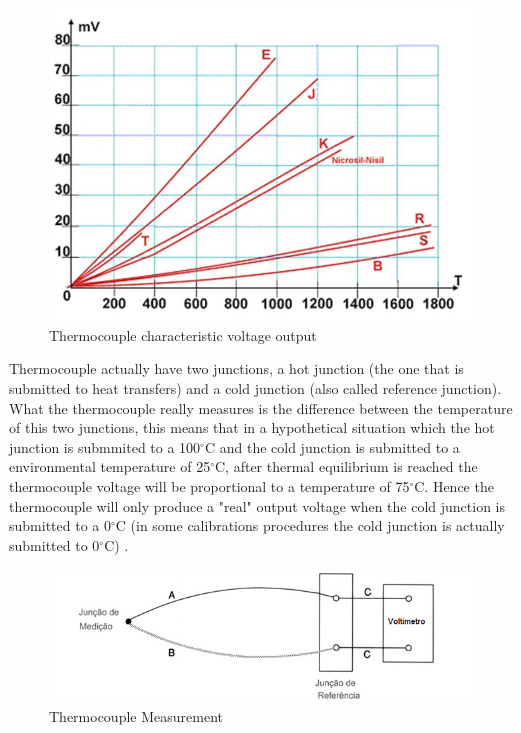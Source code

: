 	\begin{figure}[htbp]
		\centering
			\includegraphics[scale=0.6]{figuras/fig-thermocouple-output.jpg}
		\caption{Thermocouple characteristic voltage output \cite{termo-curves}}
		\label{fig:thermocoupleVoltage}
	\end{figure}
		
	Thermocouple actually have two junctions, a hot junction (the one that is submitted to heat transfers) and a cold junction (also called reference junction). What the thermocouple really measures is the difference between the temperature of this two junctions, this means that in a hypothetical situation which the hot junction is submmited to a 100$^{\circ}$C and the cold junction is submitted to a environmental temperature of 25$^{\circ}$C, after thermal equilibrium is reached the thermocouple voltage will be proportional to a temperature of 75$^{\circ}$C. Hence the thermocouple will only produce a "real" output voltage when the cold junction is submitted to a 0$^{\circ}$C (in some calibrations procedures the cold junction is actually submitted to 0$^{\circ}$C) \cite{kinzie1973thermocouple}.
		
	\begin{figure}[htbp]
		\centering
			\includegraphics[scale=0.75]{figuras/fig-thermocouple-measurement.jpg}
		\caption{Thermocouple Measurement \cite{termo-med}}
		\label{fig:thermocoupleMeasurement}
	\end{figure}
		
